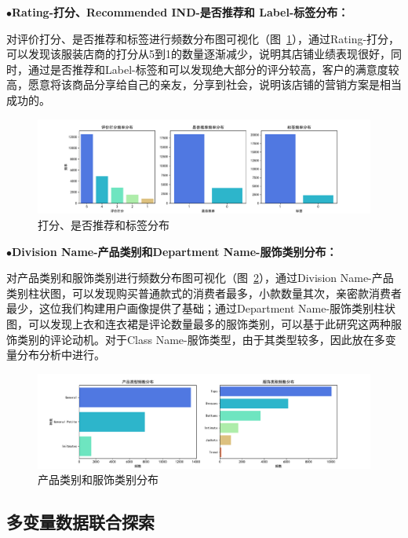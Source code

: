 \documentclass[
  journal=medium,
  manuscript=article-type,
  year=2023,
  volume=37,
]{cup-journal}
\begin{document}
$\bullet$\textbf{Rating-打分、Recommended IND-是否推荐和 Label-标签分布：}

对评价打分、是否推荐和标签进行频数分布图可视化（图~\ref{Rating_Recommended_Label}），通过Rating-打分，可以发现该服装店商的打分从5到1的数量逐渐减少，说明其店铺业绩表现很好，同时，通过是否推荐和Label-标签和可以发现绝大部分的评分较高，客户的满意度较高，愿意将该商品分享给自己的亲友，分享到社会，说明该店铺的营销方案是相当成功的。


\begin{figure}[hbt!]
    \centering
    \includegraphics[width=1.1\linewidth]{3feature.pdf}
    \caption{打分、是否推荐和标签分布}
    \label{Rating_Recommended_Label}
\end{figure}

$\bullet$\textbf{Division Name-产品类别和Department Name-服饰类别分布：}

对产品类别和服饰类别进行频数分布图可视化（图~\ref{Name}），通过Division Name-产品类别柱状图，可以发现购买普通款式的消费者最多，小款数量其次，亲密款消费者最少，这位我们构建用户画像提供了基础；通过Department Name-服饰类别柱状图，可以发现上衣和连衣裙是评论数量最多的服饰类别，可以基于此研究这两种服饰类别的评论动机。对于Class Name-服饰类型，由于其类型较多，因此放在多变量分布分析中进行。

\begin{figure}[hbt!]
    \centering
    \includegraphics[width=1.1\linewidth]{2feature_Name.pdf}
    \caption{产品类别和服饰类别分布}
    \label{Name}
\end{figure}


\subsection{多变量数据联合探索} 
\end{document}
